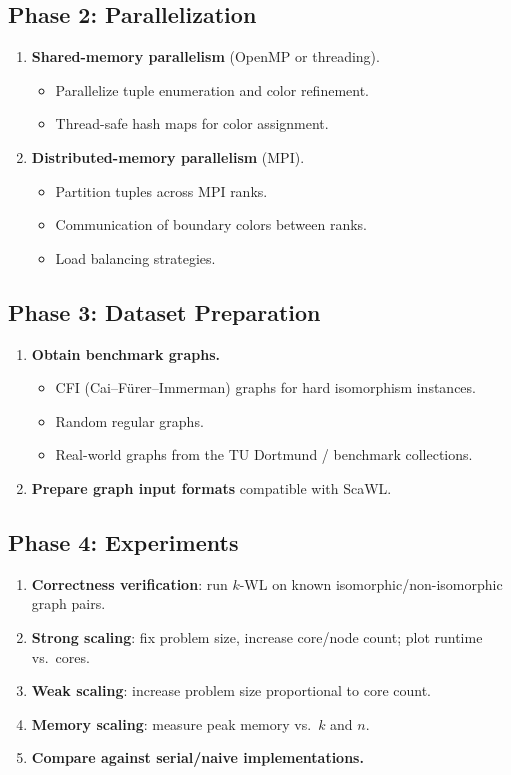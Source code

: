 \documentclass[11pt,a4paper]{article}
\begin{document}
\subsection{Phase 2: Parallelization}
\begin{enumerate}[label=\textbf{2.\arabic*}]
  \item \textbf{Shared-memory parallelism} (OpenMP or threading).
    \begin{itemize}
      \item Parallelize tuple enumeration and color refinement.
      \item Thread-safe hash maps for color assignment.
    \end{itemize}
  \item \textbf{Distributed-memory parallelism} (MPI).
    \begin{itemize}
      \item Partition tuples across MPI ranks.
      \item Communication of boundary colors between ranks.
      \item Load balancing strategies.
    \end{itemize}
\end{enumerate}

\subsection{Phase 3: Dataset Preparation}
\begin{enumerate}[label=\textbf{3.\arabic*}]
  \item \textbf{Obtain benchmark graphs.}
    \begin{itemize}
      \item CFI (Cai--F\"{u}rer--Immerman) graphs for hard isomorphism instances.
      \item Random regular graphs.
      \item Real-world graphs from the TU Dortmund / benchmark collections.
    \end{itemize}
  \item \textbf{Prepare graph input formats} compatible with ScaWL.
\end{enumerate}

\subsection{Phase 4: Experiments}
\begin{enumerate}[label=\textbf{4.\arabic*}]
  \item \textbf{Correctness verification}: run $k$-WL on known isomorphic/non-isomorphic graph pairs.
  \item \textbf{Strong scaling}: fix problem size, increase core/node count; plot runtime vs.\ cores.
  \item \textbf{Weak scaling}: increase problem size proportional to core count.
  \item \textbf{Memory scaling}: measure peak memory vs.\ $k$ and $n$.
  \item \textbf{Compare against serial/naive implementations.}
\end{enumerate}
\end{document}
